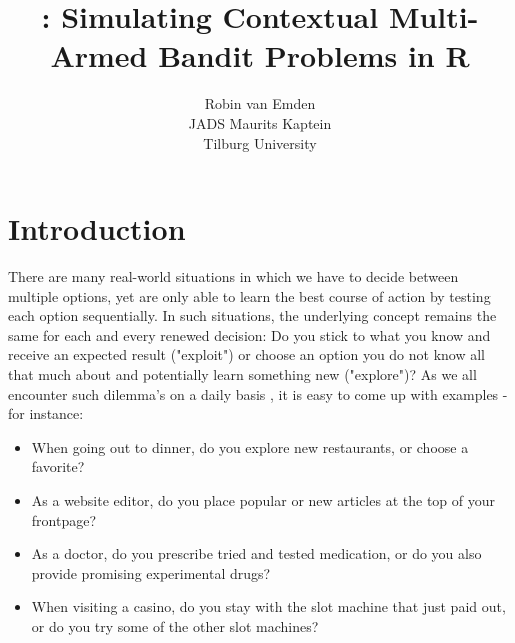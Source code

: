 \documentclass{jss}
\author{Robin van Emden\\JADS \And
  Maurits Kaptein\\Tilburg University}
\title{\pkg{contextual}: Simulating Contextual Multi-Armed Bandit Problems in R}
\begin{document}
\sloppy



\section{Introduction} \label{intro}

There are many real-world situations in which we have to decide between multiple options, yet are only able to learn the best course of action by testing each option sequentially. In such situations, the underlying concept remains the same for each and every renewed decision: Do you stick to what you know and receive an expected result ("exploit") or choose an option you do not know all that much about and potentially learn something new ("explore")? As we all encounter such dilemma's on a daily basis \citep{Wilson2014}, it is easy to come up with examples - for instance:

\begin{itemize}
\item When going out to dinner, do you explore new restaurants, or choose a favorite?
\item As a website editor, do you place popular or new articles at the top of your frontpage?
\item As a doctor, do you prescribe tried and tested medication, or do you also provide promising experimental drugs?
\item When visiting a casino, do you stay with the slot machine that just paid out, or do you try some of the other slot machines?
\end{itemize}
\end{document}
